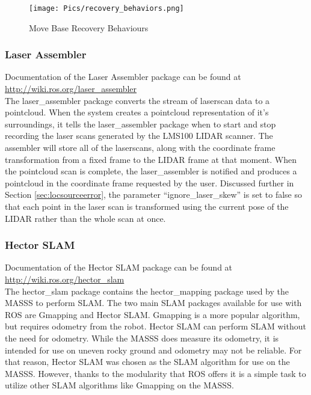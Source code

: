 \begin{figure}[H]
    \centering
    \texttt{[image: Pics/recovery\_behaviors.png]}
    \caption{Move Base Recovery Behaviours \cite{rosmovebase}}
    \label{fig:recovery}
\end{figure}

\subsubsection{Laser Assembler}


Documentation of the Laser Assembler package can be found at \url{http://wiki.ros.org/laser_assembler}\\

The laser\_assembler package converts the stream of laserscan data to a pointcloud. When the system creates a pointcloud representation of it's surroundings, it tells the laser\_assembler package when to start and stop recording the laser scans generated by the LMS100 LIDAR scanner. The assembler will store all of the laserscans, along with the coordinate frame transformation from a fixed frame to the LIDAR frame at that moment. When the pointcloud scan is complete, the laser\_assembler is notified and produces a pointcloud in the coordinate frame requested by the user. Discussed further in Section \ref{sec:locsourceerror}, the parameter ``ignore\_laser\_skew'' is set to false so that each point in the laser scan is transformed using the current pose of the LIDAR rather than the whole scan at once.\\

\subsubsection{Hector SLAM}

Documentation of the Hector SLAM package can be found at \url{http://wiki.ros.org/hector_slam}\\

The hector\_slam package contains the hector\_mapping package used by the MASSS to perform SLAM. The two main SLAM packages available for use with ROS are Gmapping and Hector SLAM. Gmapping is a more popular algorithm, but requires odometry from the robot. Hector SLAM can perform SLAM without the need for odometry. While the MASSS does measure its odometry, it is intended for use on uneven rocky ground and odometry may not be reliable. For that reason, Hector SLAM was chosen as the SLAM algorithm for use on the MASSS. However, thanks to the modularity that ROS offers it is a simple task to utilize other SLAM algorithms like Gmapping on the MASSS.\\

